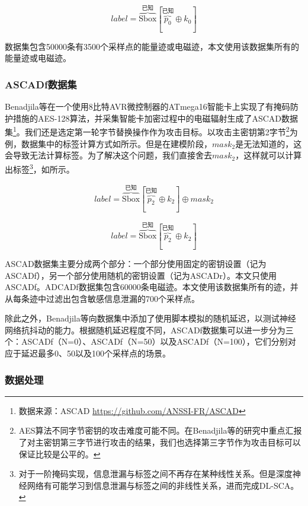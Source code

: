 {	\begin{equation}\label{eq:aesrdmodel}
		label=\overbrace{\mathrm{Sbox}}^{\mbox{已知}}[\overbrace{p_0}^{\mbox{已知}}\oplus k_0]
	\end{equation}
	
	数据集包含50000条有3500个采样点的能量迹或电磁迹，本文使用该数据集所有的能量迹或电磁迹。
	\subsubsection{ASCADf数据集}
	Benadjila等\citep{Benadjila20}在一个使用8比特AVR微控制器的ATmega16智能卡上实现了有掩码防护措施的AES-128算法，并采集智能卡加密过程中的电磁辐射生成了ASCAD数据集\footnote{数据来源：ASCAD \href{https://github.com/ANSSI-FR/ASCAD}{https://github.com/ANSSI-FR/ASCAD}}。我们还是选定第一轮字节替换操作作为攻击目标。以攻击主密钥第2字节\footnote{AES算法不同字节密钥的攻击难度可能不同。在Benadjila等的研究中重点汇报了对主密钥第三字节进行攻击的结果，我们也选择第三字节作为攻击目标可以保证比较是公平的。}为例，数据集中的标签计算方式如所示。但是在建模阶段，$mask_2$是无法知道的，这会导致无法计算标签。为了解决这个问题，我们直接舍去$mask_2$，这样就可以计算出标签\footnote{对于一阶掩码实现，信息泄漏与标签之间不再存在某种线性关系。但是深度神经网络有可能学习到信息泄漏与标签之间的非线性关系，进而完成DL-SCA。}，如所示。
	
	\begin{equation}\label{eq:ascadbadmodel}
		label=\overbrace{\mathrm{Sbox}}^{\mbox{已知}}[\overbrace{p_2}^{\mbox{已知}}\oplus k_2]\oplus mask_2
	\end{equation}
	
	\begin{equation}\label{eq:ascadmodel}
		label=\overbrace{\mathrm{Sbox}}^{\mbox{已知}}[\overbrace{p_2}^{\mbox{已知}}\oplus k_2]
	\end{equation}
	
	ASCAD数据集主要分成两个部分：一个部分使用固定的密钥设置（记为ASCADf），另一个部分使用随机的密钥设置（记为ASCADr）。本文只使用ASCADf。ADCADf数据集包含60000条电磁迹。本文使用该数据集所有的迹，并从每条迹中过滤出包含敏感信息泄漏的700个采样点。
	
	除此之外，Benadjila等向数据集中添加了使用脚本模拟的随机延迟，以测试神经网络抗抖动的能力。根据随机延迟程度不同，ASCADf数据集可以进一步分为三个：ASCADf（N=0）、ASCADf（N=50）以及ASCADf（N=100），它们分别对应于延迟最多0、50以及100个采样点的场景。
	
	\subsubsection{数据处理}
	
}
